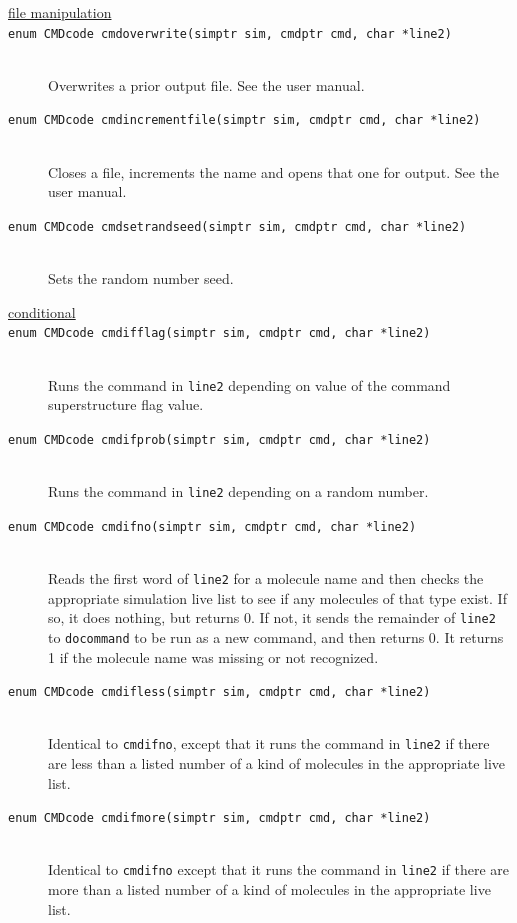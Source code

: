 \documentclass {scrbook}
\newcommand {\ttt} {\texttt}
\begin{document}
\begin{description}
\item[\underline{file manipulation}]

\item[\ttt{enum CMDcode cmdoverwrite(simptr sim, cmdptr cmd, char *line2)}]
\hfill \\
Overwrites a prior output file. See the user manual.

\item[\ttt{enum CMDcode cmdincrementfile(simptr sim, cmdptr cmd, char *line2)}]
\hfill \\
Closes a file, increments the name and opens that one for output. See the user manual.

\item[\ttt{enum CMDcode cmdsetrandseed(simptr sim, cmdptr cmd, char *line2)}]
\hfill \\
Sets the random number seed.

\item[\underline{conditional}]

\item[\ttt{enum CMDcode cmdifflag(simptr sim, cmdptr cmd, char *line2)}]
\hfill \\
Runs the command in \ttt{line2} depending on value of the command superstructure flag value.

\item[\ttt{enum CMDcode cmdifprob(simptr sim, cmdptr cmd, char *line2)}]
\hfill \\
Runs the command in \ttt{line2} depending on a random number.

\item[\ttt{enum CMDcode cmdifno(simptr sim, cmdptr cmd, char *line2)}]
\hfill \\
Reads the first word of \ttt{line2} for a molecule name and then checks the appropriate simulation live list to see if any molecules of that type exist. If so, it does nothing, but returns 0. If not, it sends the remainder of \ttt{line2} to \ttt{docommand} to be run as a new command, and then returns 0. It returns 1 if the molecule name was missing or not recognized.

\item[\ttt{enum CMDcode cmdifless(simptr sim, cmdptr cmd, char *line2)}]
\hfill \\
Identical to \ttt{cmdifno}, except that it runs the command in \ttt{line2} if there are less than a listed number of a kind of molecules in the appropriate live list.

\item[\ttt{enum CMDcode cmdifmore(simptr sim, cmdptr cmd, char *line2)}]
\hfill \\
Identical to \ttt{cmdifno} except that it runs the command in \ttt{line2} if there are more than a listed number of a kind of molecules in the appropriate live list.


\end{description}
\end{document}
